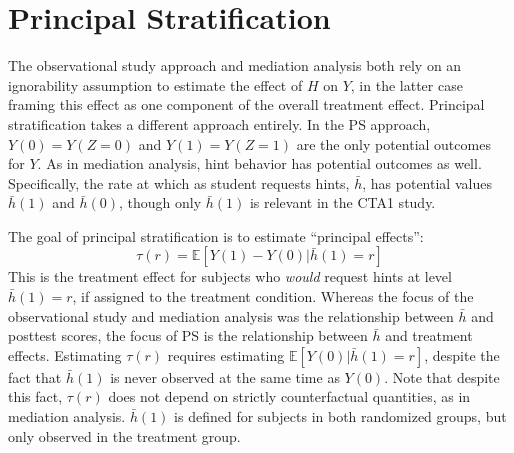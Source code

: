 \documentclass{article}\usepackage[]{graphicx}\usepackage[]{color}
\newcommand{\EE}{\mathbb{E}}
\begin{document}
\section{Principal Stratification}\label{sec:principalStratification}
The observational study approach and mediation analysis both rely on
an ignorability assumption to estimate the effect of $H$ on $Y$, in
the latter case framing this effect as one component of the overall
treatment effect.
Principal stratification \citep[PS;][]{frangakis} takes a different approach entirely.
In the PS approach, $Y(0)=Y(Z=0)$ and $Y(1)=Y(Z=1)$ are the only potential
outcomes for $Y$.
As in mediation analysis, hint behavior has potential outcomes as
well.
Specifically, the rate at which as student requests hints, $\bar{h}$,
has potential values $\bar{h}(1)$ and $\bar{h}(0)$,
though only $\bar{h}(1)$ is relevant in the CTA1 study.

The goal of principal stratification is to estimate ``principal
effects'':
\begin{equation*}
\tau(r)=\EE[Y(1)-Y(0)|\bar{h}(1)=r]
\end{equation*}
This is the treatment effect for subjects who \emph{would} request
hints at level $\bar{h}(1)=r$, if assigned to the treatment condition.
Whereas the focus of the observational study and mediation
analysis was the relationship between $\bar{h}$ and posttest scores, the
focus of PS is the relationship between $\bar{h}$ and treatment effects.
Estimating $\tau(r)$ requires estimating $\EE[Y(0)|\bar{h}(1)=r]$,
despite the fact that $\bar{h}(1)$ is never observed at the same time as
$Y(0)$. Note that despite this fact, $\tau(r)$ does not depend on
strictly counterfactual quantities, as in mediation analysis.
$\bar{h}(1)$ is defined for subjects in both randomized groups, but only
observed in the treatment group.
\end{document}
